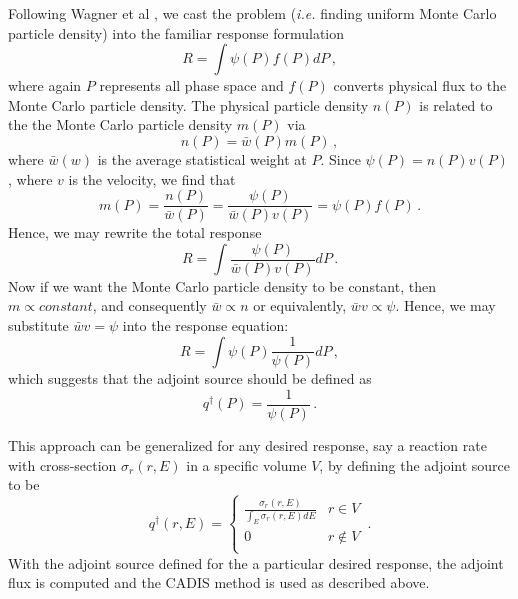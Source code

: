 \documentclass[letter,11pt]{article}
\newcommand{\ie}{{\it i.e. }}
\begin{document}
Following Wagner et al \cite{wagner2009fwc}, we cast the problem (\ie finding uniform Monte Carlo particle density) into the familiar response formulation
\begin{equation}
 R = \int \psi(P) f(P) dP \, ,
\end{equation}
where again $P$ represents all phase space and $f(P)$ converts physical flux to the Monte Carlo particle density.  The physical particle density $n(P)$ is related to the the Monte Carlo particle density $m(P)$ via
\begin{equation}
 n(P) = \bar{w}(P)m(P) \, ,
\end{equation}
where $\bar{w}(w)$ is the average statistical weight at $P$. Since $\psi(P) = n(P)v(P)$, where $v$ is the velocity, we find that
\begin{equation}
 m(P) = \frac{n(P)}{\bar{w}(P)} = \frac{\psi(P)}{\bar{w}(P)v(P)} = \psi(P) f(P) \, .
\end{equation}
Hence, we may rewrite the total response
\begin{equation}
 R = \int \frac{\psi(P)}{\bar{w}(P)v(P)} dP \, .
\end{equation}
Now if we want the Monte Carlo particle density to be constant,  then $m\propto constant$, and consequently $\bar{w} \propto n$ or equivalently, $\bar{w} v \propto \psi$.  Hence, we may substitute $\bar{w} v = \psi$ into the response equation:
\begin{equation}
 R = \int \psi(P) \frac{1}{\psi(P)} dP \, ,
\end{equation}
which suggests that the adjoint source should be defined as
\begin{equation}
 q^\dag(P) = \frac{1}{\psi(P)} \, .
\end{equation}

This approach can be generalized for any desired response, say a reaction rate with cross-section $\sigma_r(r,E)$ in a specific volume $V$, by defining the adjoint source to be
\begin{equation}
q^\dag(r,E) = 
\begin{cases} \frac{\sigma_r(r,E)}{ \int_E \sigma_r(r,E) dE} &  r\in V \\
              0 &  r \notin V \\
\end{cases} \, .
\end{equation}
With the adjoint source defined for the a particular desired response, the adjoint flux is computed and the CADIS method is used as described above.
\end{document}
